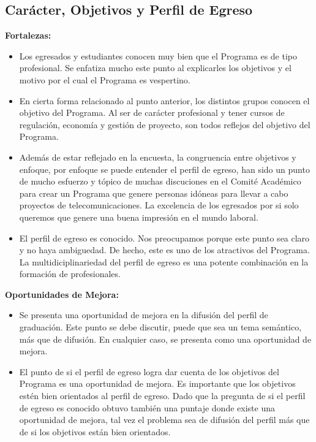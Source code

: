 \subsection{Carácter, Objetivos y Perfil de Egreso}

\noindent\textbf{Fortalezas:}

\begin{itemize}
\item Los egresados y estudiantes conocen muy bien que el Programa es de tipo profesional. Se enfatiza mucho este 
punto al explicarles los objetivos y el motivo por el cual el Programa es vespertino. 
\item En cierta forma relacionado al punto anterior, los distintos grupos conocen el objetivo del Programa. Al ser de carácter 
profesional y tener cursos de regulación, economía y gestión de proyecto, son todos reflejos del objetivo del Programa.
\item Además de estar reflejado en la encuesta, la congruencia entre objetivos y enfoque, por enfoque se puede entender el perfil
de egreso, han sido un punto de mucho esfuerzo y tópico de muchas discuciones en el Comité Académico para crear un Programa que 
genere personas idóneas para llevar a cabo proyectos de telecomunicaciones. La excelencia de los egresados por si solo queremos 
que genere una buena impresión en el mundo laboral. 
\item El perfil de egreso es conocido. Nos preocupamos porque este punto sea claro y no haya ambiguedad. De hecho, este es uno 
de los atractivos del Programa. La multidiciplinariedad del perfil de egreso es una potente combinación en la formación de profesionales.
\end{itemize}

\noindent\textbf{Oportunidades de Mejora:}

\begin{itemize}
\item Se presenta una oportunidad de mejora en la difusión del perfil de graduación. Este punto se debe discutir, puede que sea un 
tema semántico, más que de difusión. En cualquier caso, se presenta como una oportunidad de mejora.
\item El punto de si el perfil de egreso logra dar cuenta de los objetivos del Programa es una oportunidad de mejora. Es importante que 
los objetivos estén bien orientados al perfil de egreso. Dado que la pregunta de si el perfil de egreso es conocido obtuvo también una puntaje 
donde existe una oportunidad de mejora, tal vez el problema sea de difusión del perfil más que de si los objetivos están bien orientados. 
\end{itemize}



